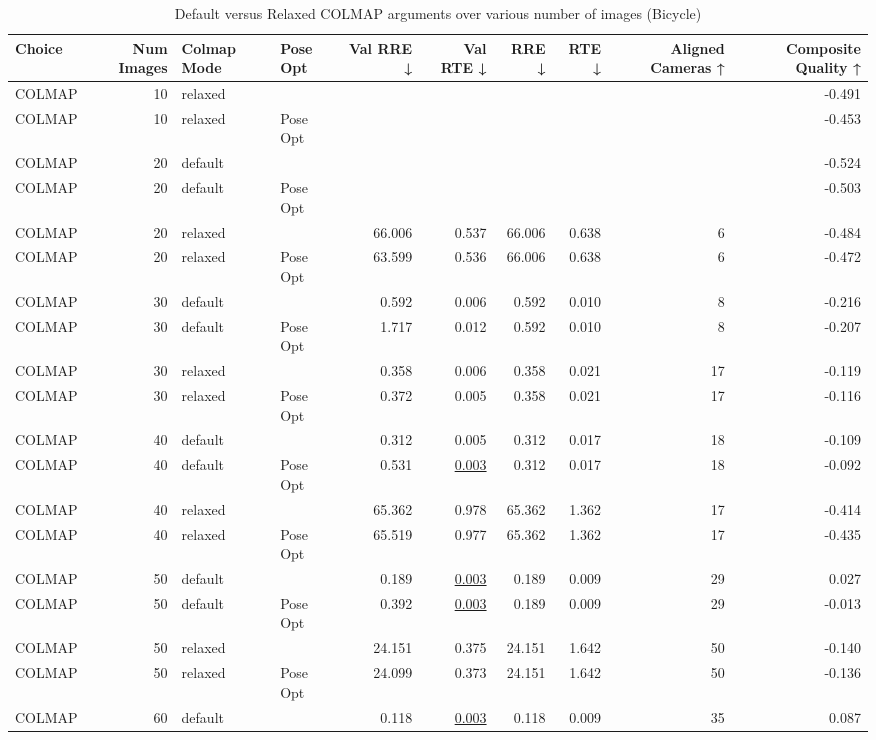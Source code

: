 \begin{table}[H]
\caption{Default versus Relaxed COLMAP arguments over various number of images (Bicycle)}
\label{tab:08_colmap_mode_bicycle}
\begin{tabular}{lrllrrrrrr}
\toprule
Choice & Num Images & Colmap Mode & Pose Opt & Val RRE ↓ & Val RTE ↓ & RRE ↓ & RTE ↓ & Aligned Cameras ↑ & Composite Quality ↑ \\
\midrule
COLMAP & 10 & relaxed &  &  &  &  &  &  & -0.491 \\
COLMAP & 10 & relaxed & Pose Opt &  &  &  &  &  & -0.453 \\
COLMAP & 20 & default &  &  &  &  &  &  & -0.524 \\
COLMAP & 20 & default & Pose Opt &  &  &  &  &  & -0.503 \\
COLMAP & 20 & relaxed &  & 66.006 & 0.537 & 66.006 & 0.638 & 6 & -0.484 \\
COLMAP & 20 & relaxed & Pose Opt & 63.599 & 0.536 & 66.006 & 0.638 & 6 & -0.472 \\
COLMAP & 30 & default &  & 0.592 & 0.006 & 0.592 & 0.010 & 8 & -0.216 \\
COLMAP & 30 & default & Pose Opt & 1.717 & 0.012 & 0.592 & 0.010 & 8 & -0.207 \\
COLMAP & 30 & relaxed &  & 0.358 & 0.006 & 0.358 & 0.021 & 17 & -0.119 \\
COLMAP & 30 & relaxed & Pose Opt & 0.372 & 0.005 & 0.358 & 0.021 & 17 & -0.116 \\
COLMAP & 40 & default &  & 0.312 & 0.005 & 0.312 & 0.017 & 18 & -0.109 \\
COLMAP & 40 & default & Pose Opt & 0.531 & \underline{0.003} & 0.312 & 0.017 & 18 & -0.092 \\
COLMAP & 40 & relaxed &  & 65.362 & 0.978 & 65.362 & 1.362 & 17 & -0.414 \\
COLMAP & 40 & relaxed & Pose Opt & 65.519 & 0.977 & 65.362 & 1.362 & 17 & -0.435 \\
COLMAP & 50 & default &  & 0.189 & \underline{0.003} & 0.189 & 0.009 & 29 & 0.027 \\
COLMAP & 50 & default & Pose Opt & 0.392 & \underline{0.003} & 0.189 & 0.009 & 29 & -0.013 \\
COLMAP & 50 & relaxed &  & 24.151 & 0.375 & 24.151 & 1.642 & 50 & -0.140 \\
COLMAP & 50 & relaxed & Pose Opt & 24.099 & 0.373 & 24.151 & 1.642 & 50 & -0.136 \\
COLMAP & 60 & default &  & 0.118 & \underline{0.003} & 0.118 & 0.009 & 35 & 0.087 \\

\end{tabular}
\end{table}
